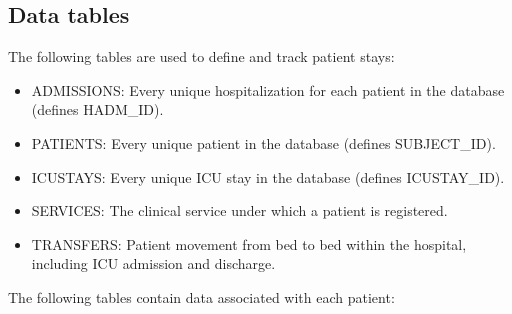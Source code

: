 \documentclass[english]{article}
\begin{document}
\subsection*{Data tables}

The following tables are used to define and track patient stays:

\begin{itemize}
  \item ADMISSIONS: Every unique hospitalization for each patient in the database (defines HADM\_ID).
  \item PATIENTS: Every unique patient in the database (defines SUBJECT\_ID).
  \item ICUSTAYS: Every unique ICU stay in the database (defines ICUSTAY\_ID).
  \item SERVICES: The clinical service under which a patient is registered.
  \item TRANSFERS: Patient movement from bed to bed within the hospital, including ICU admission and discharge.
\end{itemize}

The following tables contain data associated with each patient:
\end{document}
